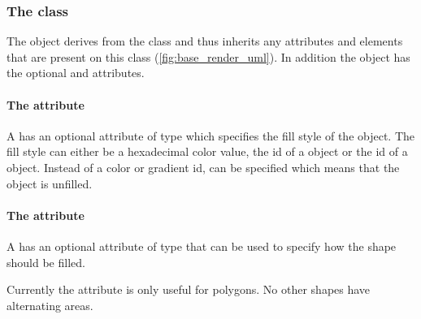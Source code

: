\subsubsection{The  class}
\label{graphicalprimitivetwod-class}

The \GraphicalPrimitiveTwoD object derives from the
\GraphicalPrimitiveOneD class and thus inherits any attributes and
elements that are present on this class (\ref{fig:base_render_uml}).
In addition the \GraphicalPrimitiveTwoD object has the optional  and  attributes.

\paragraph{The \fixttspace{} attribute}

A \GraphicalPrimitiveTwoD has an optional attribute  of type
 which specifies 
the fill style of the object. The fill style can either be a hexadecimal
color value, the id of a \ColorDefinition object or the id of a \GradientBase
object. 
Instead of a color or gradient id,  can be specified
 which means that the object is unfilled.


\paragraph{The \fixttspace{} attribute}

A \GraphicalPrimitiveTwoD has an optional attribute  of
type \FillRule that can be used to specify how the shape should be filled. 

Currently the  attribute is only useful for polygons. No other shapes have alternating areas.

